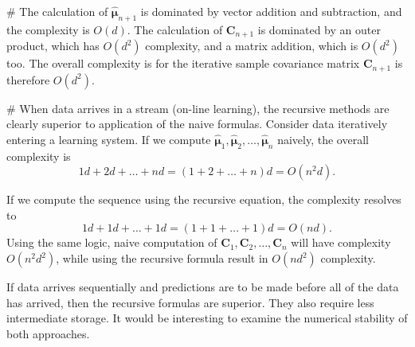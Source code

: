 \documentclass[12pt, a4paper]{article}
\newcommand{\vect}[1]{\bm{#1}}
\begin{document}
\begin{easylist}[enumerate]
	
	# The calculation of $\hat{\vect{\mu}}_{n+1}$ is dominated by vector addition and subtraction, and the complexity is $O(d)$.
	The calculation of $\vect{C}_{n+1}$ is dominated by an outer product, which has $O(d^2)$ complexity, and a matrix addition, which is $O(d^2)$ too.
	The overall complexity is for the iterative sample covariance matrix $\vect{C}_{n+1}$ is therefore $O(d^2)$.
	
	# When data arrives in a stream (on-line learning), the recursive methods are clearly superior to application of the naive formulas.
	Consider data iteratively entering a learning system.
	If we compute $\hat{\vect{\mu}}_{1}, \hat{\vect{\mu}}_{2}, \dots, \hat{\vect{\mu}}_{n}$ naively, the overall complexity is
	\begin{equation*}
	1d + 2d + \dots + nd = \left(1 + 2 + \dots + n\right) d = O(n^2 d).
	\end{equation*}
	
	If we compute the sequence using the recursive equation, the complexity resolves to
	\begin{equation*}
	1d + 1d + \dots + 1d = \left(1 + 1 + \dots + 1\right) d = O(n d).
	\end{equation*}
	Using the same logic, naive computation of $\vect{C}_{1}, \vect{C}_{2}, \dots, \vect{C}_{n}$ will have complexity $O(n^2 d^2)$, while using the recursive formula result in $O(nd^2)$ complexity. 
	
	If data arrives sequentially and predictions are to be made before all of the data has arrived, then the recursive formulas are superior.
	They also require less intermediate storage.
	It would be interesting to examine the numerical stability of both approaches.
	
\end{easylist}
\end{document}
